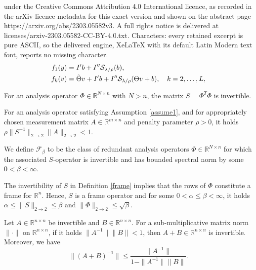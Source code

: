 \documentclass[10pt,a4paper]{amsart}
\newcommand{\RNn}{\mathbb{R}^{N\times n}}
\newcommand{\Rmn}{\mathbb{R}^{m\times n}}
\newcommand{\opnorm}{2\rightarrow2}
\newcommand{\rn}{\mathbb{R}^n}
\newcommand{\st}{\mathcal{S}}\newcommand{\sgn}{\mathrm{sign}}
\begin{document}
under the Creative Commons Attribution 4.0 International licence, as recorded in the arXiv licence metadata for this exact version and shown on the abstract page https://arxiv.org/abs/2303.05582v3. A full rights notice is delivered at licenses/arxiv-2303.05582-CC-BY-4.0.txt. Characters: every retained excerpt is pure ASCII, so the delivered engine, XeLaTeX with its default Latin Modern text font, reports no missing character.
\begin{align}
    \label{layer1}
    f_1(y) & =I'b+I''\st_{\lambda/\rho}(b),\\
    \label{layerk}
    f_k(v) & =\Tilde{\Theta}v+I'b+I''\st_{\lambda/\rho}(\Theta v+b), \quad k = 2, \hdots, L,
\end{align}

\begin{assume}\label{assume1}
    For an analysis operator $\Phi\in\RNn$ with $N>n$, the matrix $S=\Phi^T\Phi$ is invertible.
\end{assume}

\begin{assume}\label{assume2}
    For an analysis operator satisfying Assumption \ref{assume1}, and for appropriately chosen measurement matrix $A\in\Rmn$ and penalty parameter $\rho>0$, it holds $\rho\|S^{-1}\|_{\opnorm}\|A\|_{\opnorm}<1$.
\end{assume}

\begin{definition}\label{frame}
    We define $\mathcal{F}_{\beta }$ to be the class of redundant analysis operators $\Phi\in\RNn$ for which the associated $S$-operator is invertible and has bounded spectral norm by some $0<\beta<\infty$.
\end{definition}

\begin{remark}\label{phibound}
    The invertibility of $S$ in Definition \ref{frame} implies that the rows of $\Phi$ constitute a frame for $\rn$. Hence, $S$ is a frame operator and for some $0<\alpha\leq\beta<\infty$, it holds $\alpha\leq\|S\|_{\opnorm}\leq\beta$ and $\|\Phi\|_{\opnorm}\leq\sqrt{\beta}$.
\end{remark}

\begin{lemma}\label{invab}
    Let $A\in\mathbb{R}^{n\times n}$ be invertible and $B\in\mathbb{R}^{n\times n}$. For a sub-multiplicative matrix norm $\|\cdot\|$ on $\mathbb{R}^{n\times n}$, if it holds $\|A^{-1}\|\|B\|<1$, then $A+B\in\mathbb{R}^{n\times n}$ is invertible. Moreover, we have
    \begin{equation}
        \|(A+B)^{-1}\|\leq\frac{\|A^{-1}\|}{1-\|A^{-1}\|\|B\|}.
    \end{equation}
\end{lemma}
\end{document}

